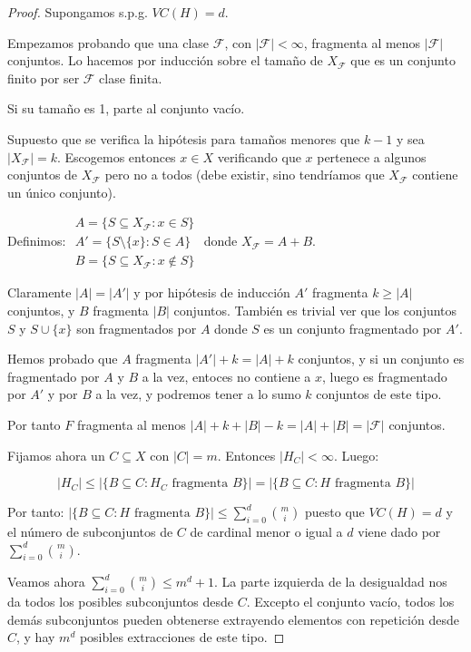 \begin{proof}
Supongamos s.p.g. $VC(H) = d$.

Empezamos probando que una clase $\mathcal{F}$, con $|\mathcal{F}| < \infty$, fragmenta al menos $|\mathcal{F}|$ conjuntos. 
Lo hacemos por inducción sobre el tamaño de $X_\mathcal{F}$ que es un conjunto finito por ser $\mathcal{F}$ clase finita.

\begin{subenv}
Si su tamaño es 1, parte al conjunto vacío.

Supuesto que se verifica la hipótesis para tamaños menores que $k-1$ y sea $|X_\mathcal{F}| = k$. Escogemos entonces 
$x\in X$ verificando que $x$ pertenece a algunos conjuntos de $X_\mathcal{F}$ pero no a todos (debe existir, sino 
tendríamos que $X_\mathcal{F}$ contiene un único conjunto).

Definimos: $\begin{array}{l} 
	A = \{S \subseteq X_\mathcal{F} : x\in S\} \\
        A'=\{S\setminus\{x\} : S \in A\} \\ 
        B= \{S \subseteq X_\mathcal{F} : x\not\in S\}
     \end{array}$ donde $X_{\mathcal{F}} = A + B$.

Claramente $|A| = |A'|$ y por hipótesis de inducción $A'$ fragmenta $k \ge |A|$ conjuntos, y $B$ fragmenta $|B|$ conjuntos. 
También es trivial ver que los conjuntos $S$ y $S\cup \{x\}$ son fragmentados por $A$ donde $S$ es un conjunto fragmentado 
por $A'$. 

Hemos probado que $A$ fragmenta $|A'| + k = |A|+k$ conjuntos, y si un conjunto es fragmentado por $A$ y $B$ a la vez, 
entoces no contiene a $x$, luego es fragmentado por $A'$ y por $B$ a la vez, y podremos tener a lo sumo $k$ conjuntos de
este tipo.
\end{subenv}

Por tanto $F$ fragmenta al menos $|A| + k + |B| - k = |A| + |B| = |\mathcal{F}|$ conjuntos.

Fijamos ahora un $C\subseteq X$ con $|C| = m$. Entonces $|H_C| < \infty$. Luego: 

\[|H_C| \le |\{B\subseteq C : H_C \textrm{ fragmenta } B\}| = |\{B\subseteq C : H \textrm{ fragmenta } B\}|\] 

Por tanto: $|\{B\subseteq C : H \textrm{ fragmenta } B\}| \le \sum_{i=0}^d \binom{m}{i}$ puesto que $VC(H)=d$ y el número de 
subconjuntos de $C$ de cardinal menor o igual a $d$ viene dado por $\sum_{i=0}^d \binom{m}{i}$.

Veamos ahora $\sum_{i=0}^d \binom{m}{i} \le m^d + 1$. La parte izquierda de la desigualdad nos da todos los posibles 
subconjuntos desde $C$. Excepto el conjunto vacío, todos los demás subconjuntos pueden obtenerse extrayendo elementos con
repetición desde $C$, y hay $m^d$ posibles extracciones de este tipo.
\end{proof}

